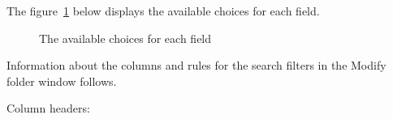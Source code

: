 The figure~\ref{fig:modify_folder} below displays the available choices for each field.

\begin{figure}[htpb]
    \centering
    \caption{The available choices for each field}
    \label{fig:modify_folder}
\end{figure}

Information about the columns and rules for the search filters in the Modify folder window follows.

Column headers:

